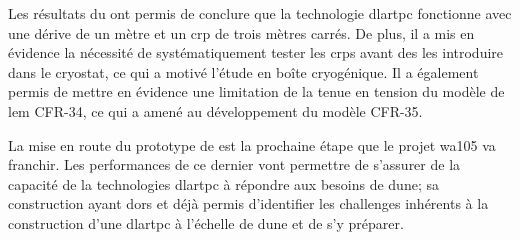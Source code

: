 Les résultats du \TOO{} ont permis de conclure que la technologie \gls{dlartpc} fonctionne avec une dérive de un mètre et un \gls{crp} de trois mètres carrés. De plus, il a mis en évidence la nécessité de systématiquement tester les \glspl{crp} avant des les introduire dans le cryostat, ce qui a motivé l'étude en boîte cryogénique. Il a également permis de mettre en évidence une limitation de la tenue en tension du modèle de \gls{lem} CFR-34, ce qui a amené au développement du modèle CFR-35.

La mise en route du prototype de \SSS{} est la prochaine étape que le projet \gls{wa105} va franchir. Les performances de ce dernier vont permettre de s'assurer de la capacité de la technologies \gls{dlartpc} à répondre aux besoins de \gls{dune}; sa construction ayant dors et déjà permis d'identifier les challenges inhérents à la construction d'une \gls{dlartpc} à l'échelle de \gls{dune} et de s'y préparer.